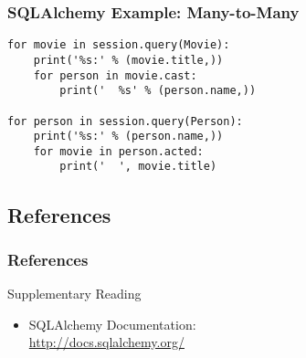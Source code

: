 \documentclass[dvipsnames]{beamer}
\theoremstyle{plain}
\begin{document}
\begin{frame}[fragile]
  \frametitle{SQLAlchemy Example: Many-to-Many}

  \begin{lstlisting}
for movie in session.query(Movie):
    print('%s:' % (movie.title,))
    for person in movie.cast:
        print('  %s' % (person.name,))

for person in session.query(Person):
    print('%s:' % (person.name,))
    for movie in person.acted:
        print('  ', movie.title)
  \end{lstlisting}
\end{frame}

\subsection*{References}

\begin{frame}
  \frametitle{References}

  \begin{block}{Supplementary Reading}
    \begin{itemize}
    \item SQLAlchemy Documentation:\\
      \url{http://docs.sqlalchemy.org/}
    \end{itemize}
  \end{block}
\end{frame}
\end{document}
